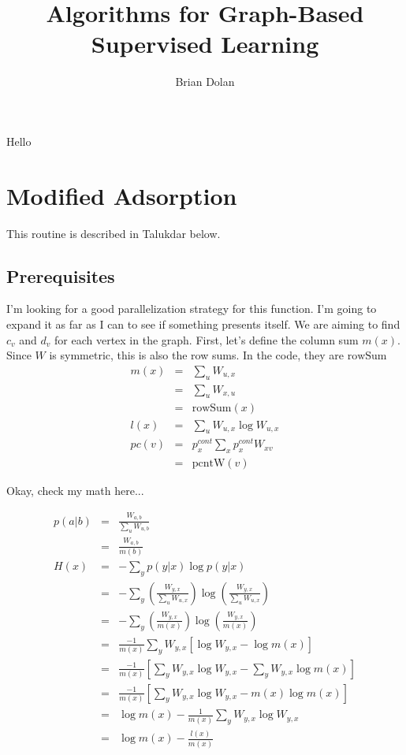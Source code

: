 \documentclass{article}
\begin{document}
\title{Algorithms for Graph-Based Supervised Learning}
\author{Brian Dolan}
\maketitle
Hello

\section{Modified Adsorption}

This routine is described in Talukdar below.

\subsection{Prerequisites}

I'm looking for a good parallelization strategy for this function.  I'm going to expand it as far as I can to see if something presents itself.  We are aiming to find $c_v$ and $d_v$ for each vertex in the graph.  First, let's define the column sum $m(x)$.  Since $W$ is symmetric, this is also the row sums.  In the code, they are $\mbox{rowSum}$
\begin{eqnarray}
m(x) &=& \sum_u W_{u,x} \\
  &=& \sum_u W_{x,u} \\
  &=& \mbox{rowSum}(x) \\
l(x) &=& \sum_u W_{u,x} \log W_{u,x} \\
pc(v) &=& p_x^{cont} \sum_x p_x^{cont} W_{xv} \\
  &=& \mbox{pcntW}(v)
\end{eqnarray}

Okay, check my math here...

\begin{eqnarray}
p(a|b) &=& \frac{W_{a,b}}{\sum_u W_{u,b}} \\
  &=& \frac{W_{a,b}}{m(b)} \\
H(x) &=& -\sum_y p(y|x) \log p(y|x) \\
&=& -\sum _y \left( \frac{W_{y,x}} {\sum_u W_{u,x} } \right) \log \left(  \frac{W_{y,x}}{\sum_u W_{u,x} } \right) \\
&=& -\sum _y \left( \frac{W_{y,x}} {m(x) } \right) \log \left(  \frac{W_{y,x}}{m(x) } \right) \\
&=& \frac{-1}{m(x)} \sum_y W_{y,x} \left[ \log W_{y,x} - \log m(x) \right] \\
&=& \frac{-1}{m(x)} \left[ \sum_y W_{y,x} \log W_{y,x} -  \sum_y W_{y,x} \log m(x) \right] \\
&=& \frac{-1}{m(x)} \left[ \sum_y W_{y,x} \log W_{y,x} - m(x) \log m(x) \right] \\
&=& \log m(x) -  \frac{1}{m(x)}\sum_y W_{y,x} \log W_{y,x} \\
&=& \log m(x) - \frac{l(x)}{m(x)}
\end{eqnarray}
\end{document}
